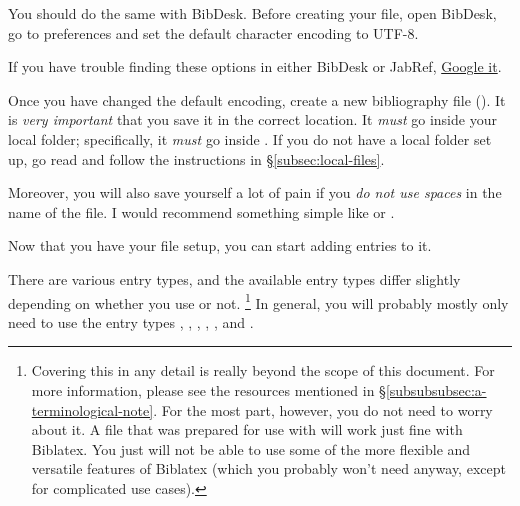 You should do the same with BibDesk.
Before creating your  file, open BibDesk, go to preferences and set the default character encoding to UTF-8.

If you have trouble finding these options in either BibDesk or JabRef, \href{https://xkcd.com/627/}{Google it}. 

Once you have changed the default encoding, create a new bibliography file ().
It is \emph{very important} that you save it in the correct location.
It \emph{must} go inside your local  folder; specifically, it \emph{must} go inside .
If you do not have a local  folder set up, go read and follow the instructions in \S\ref{subsec:local-files}.

Moreover, you will also save yourself a lot of pain if you \emph{do not use spaces} in the name of the file.
I would recommend something simple like  or .

Now that you have your  file setup, you can start adding entries to it.

\label{subsubsubsec:entry-types}

There are various entry types, and the available entry types differ slightly depending on whether you use  or not.%
\footnote{%
\label{fn:entry-types-biblatex-vs-bibtex}
Covering this in any detail is really beyond the scope of this document.
For more information, please see the resources mentioned in \S\ref{subsubsubsec:a-terminological-note}.
For the most part, however, you do not need to worry about it.
A  file that was prepared for use with  will work just fine with Biblatex.
You just will not be able to use some of the more flexible and versatile features of Biblatex (which you probably won't need anyway, except for complicated use cases).%
}
In general, you will probably mostly only need to use the entry types , , , , , and .

